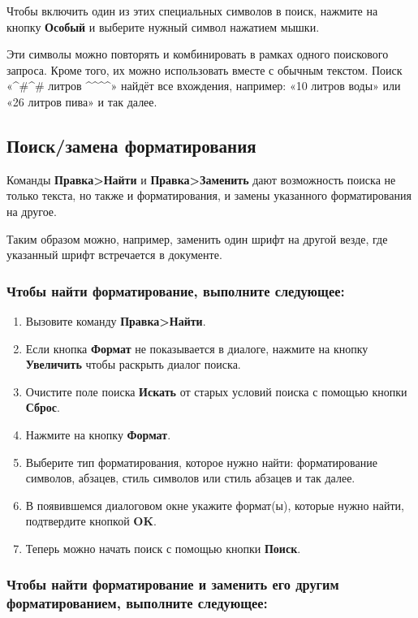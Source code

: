 \documentclass[a4paper,10pt]{article}
\begin{document}
Чтобы включить один из этих специальных символов в поиск, нажмите на кнопку \textbf{Особый} и выберите нужный символ нажатием мышки.

Эти символы можно повторять и комбинировать в рамках одного поискового запроса. Кроме того, их можно использовать вместе с обычным текстом. Поиск «\textasciicircum\#\textasciicircum\# литров \textasciicircum \textdollar\textasciicircum \textdollar\textasciicircum \textdollar\textasciicircum \textdollar» найдёт все вхождения, например: «10 литров воды» или «26 литров пива» и так далее.

\subsection{Поиск/замена форматирования}
Команды \textbf{Правка>Найти} и \textbf{Правка>Заменить} дают возможность поиска не только текста, но также и форматирования, и замены указанного форматирования на другое.

Таким образом можно, например, заменить один шрифт на другой везде, где указанный шрифт встречается в документе.

\subsubsection{Чтобы найти форматирование, выполните следующее:}
\begin{enumerate}
 \item Вызовите команду \textbf{Правка>Найти}.
 \item Если кнопка \textbf{Формат} не показывается в диалоге, нажмите на кнопку \textbf{Увеличить} чтобы раскрыть диалог поиска.
 \item Очистите поле поиска \textbf{Искать} от старых условий поиска с помощью кнопки \textbf{Сброс}.
 \item Нажмите на кнопку \textbf{Формат}.
 \item Выберите тип форматирования, которое нужно найти: форматирование символов, абзацев, стиль символов или стиль абзацев и так далее.
 \item В появившемся диалоговом окне укажите формат(ы), которые нужно найти, подтвердите кнопкой \textbf{OK}.
 \item Теперь можно начать поиск с помощью кнопки \textbf{Поиск}.
\end{enumerate}

\subsubsection{Чтобы найти форматирование и заменить его другим форматированием, выполните следующее:}
\end{document}
